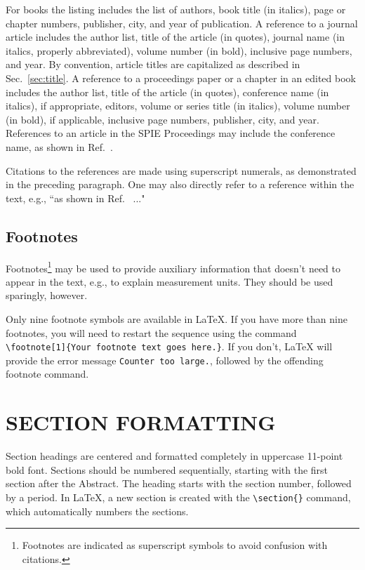 \documentclass[]{spie}  %
\begin{document}
For books\cite{Lamport94,Alred03,Goossens97} the listing includes the
list of authors, book title (in italics), page or chapter numbers,
publisher, city, and year of publication.  A reference to a journal
article\cite{Metropolis53} includes the author list, title of the
article (in quotes), journal name (in italics, properly abbreviated),
volume number (in bold), inclusive page numbers, and year.  By
convention\cite{Lamport94}, article titles are capitalized as
described in Sec.~\ref{sec:title}.  A reference to a proceedings paper
or a chapter in an edited book\cite{Gull89a} includes the author list,
title of the article (in quotes), conference name (in italics), if
appropriate, editors, volume or series title (in italics), volume
number (in bold), if applicable, inclusive page numbers, publisher,
city, and year.  References to an article in the SPIE Proceedings may
include the conference name, as shown in Ref.~.

Citations to the references are made using superscript numerals, as
demonstrated in the preceding paragraph.  One may also directly refer
to a reference within the text, e.g., ``as shown in
Ref.~ ..."

\subsection{Footnotes}
Footnotes\footnote{Footnotes are indicated as superscript symbols to
  avoid confusion with citations.} may be used to provide auxiliary
information that doesn't need to appear in the text, e.g., to explain
measurement units.  They should be used sparingly, however.

Only nine footnote symbols are available in LaTeX. If you have more
than nine footnotes, you will need to restart the sequence using the
command \verb|\footnote[1]{Your footnote text goes here.}|. If you
don't, LaTeX will provide the error message {\tt Counter too large.},
followed by the offending footnote command.

\section{SECTION FORMATTING} \label{sec:sections}

Section headings are centered and formatted completely in uppercase
11-point bold font.  Sections should be numbered sequentially,
starting with the first section after the Abstract.  The heading
starts with the section number, followed by a period.  In LaTeX, a new
section is created with the \verb|\section{}| command, which
automatically numbers the sections.
\end{document}
